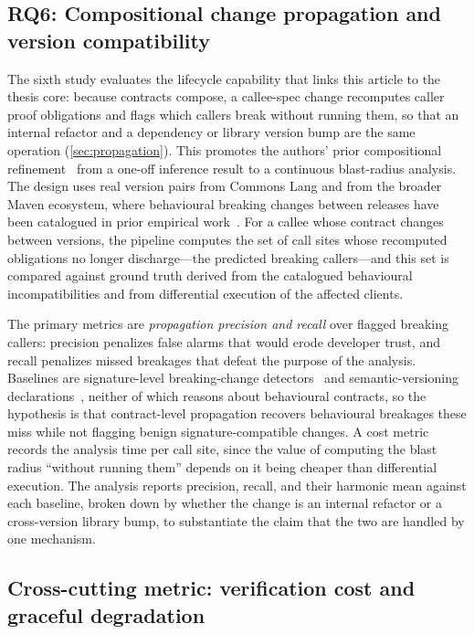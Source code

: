 \subsection{RQ6: Compositional change propagation and version compatibility}\label{subsec:eval_rq6}

The sixth study evaluates the lifecycle capability that links this article to the thesis core: because contracts compose, a callee-spec change recomputes caller proof obligations and flags which callers break without running them, so that an internal refactor and a dependency or library version bump are the same operation (\cref{sec:propagation}). This promotes the authors' prior compositional refinement~\cite{edmonds_article3} from a one-off inference result to a continuous blast-radius analysis. The design uses real version pairs from Commons Lang and from the broader Maven ecosystem, where behavioural breaking changes between releases have been catalogued in prior empirical work~\cite{ochoa2022breaking,mostafa2017behavioral,jayasuriya2024understanding}. For a callee whose contract changes between versions, the pipeline computes the set of call sites whose recomputed obligations no longer discharge---the predicted breaking callers---and this set is compared against ground truth derived from the catalogued behavioural incompatibilities and from differential execution of the affected clients.

The primary metrics are \emph{propagation precision and recall} over flagged breaking callers: precision penalizes false alarms that would erode developer trust, and recall penalizes missed breakages that defeat the purpose of the analysis. Baselines are signature-level breaking-change detectors~\cite{brito2018apidiff} and semantic-versioning declarations~\cite{preston2013semver,raemaekers2017semver}, neither of which reasons about behavioural contracts, so the hypothesis is that contract-level propagation recovers behavioural breakages these miss while not flagging benign signature-compatible changes. A cost metric records the analysis time per call site, since the value of computing the blast radius ``without running them'' depends on it being cheaper than differential execution. The analysis reports precision, recall, and their harmonic mean against each baseline, broken down by whether the change is an internal refactor or a cross-version library bump, to substantiate the claim that the two are handled by one mechanism.

\subsection{Cross-cutting metric: verification cost and graceful degradation}\label{subsec:eval_cost}

